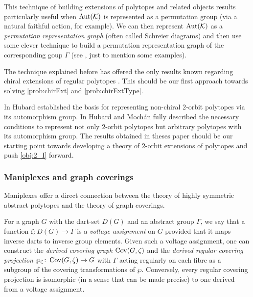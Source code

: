 \documentclass[a4paper,12pt,english]{article}
\begin{document}
This technique of building extensions of polytopes and related objects results particularly useful when $\operatorname{Aut}(\mathcal{K})$ is represented as a permutation group (via a natural faithful action, for example). 
We can then represent $\operatorname{Aut}(\mathcal{K})$ as a \emph{permutation representation graph} (often called Schreier diagrams) and then use some clever technique to build a permutation representation graph of the corresponding goup $\Gamma$ (see \cite{Pellicer2010_ExtensionsDuallyBipartite,PellPotTol2019_ExistenceResultTwo,Pellicer2010_ConstructionHigherRank,PelliWeiss2010_GeneralizedCprGraphs,Pellicer2009_ExtensionsRegularPolytopes,CondHubORe2024_ConstructionChiralPolytopes,ConHubORPe2015_ConstructionChiral4,MonteToled_ChiralExtensionsRegular_preprint,MonteWeiss2021_ProperLocallySpherical}, just to mention some examples).

The technique explained before has offered the only results known regarding chiral extensions of regular polytopes \cite*{CondHubORe2024_ConstructionChiralPolytopes,MonteToled_ChiralExtensionsRegular_preprint}. 
This should be our first approach towards solving \cref{prob:chirExt} and \cref{prob:chirExtType}. 


In \cite{Hubard2010_TwoOrbitPolyhedra} Hubard established the basis for representing non-chiral $2$-orbit polytopes via its automorphism group. 
In \cite*{HubarMocha2023_AllPolytopesAre} Hubard and Mochán fully described the necessary conditions to represent not only $2$-orbit polytopes but arbitrary polytopes with its automorphism group. 
The results obtained in theses paper should be our starting point towards developing a theory of $2$-orbit extensions of polytopes and push \cref{obj:2_I} forward.

\subsubsection*{Maniplexes and graph coverings}

Maniplexes offer a direct connection between the theory of highly symmetric abstract polytopes and the theory of graph coverings. 

For a graph $G$ with the dart-set $D(G)$ and an abstract group $\Gamma$, we say that a function $\zeta :  D(G) \to \Gamma$ is  a \emph{voltage assignment}  on $G$ provided that it maps inverse darts to inverse group elements. 
Given such
 a voltage assignment, one can construct the \emph{derived covering graph} $\operatorname{Cov}(G,\zeta)$ and the \emph{derived regular covering projection}
 $\wp_\zeta \colon \operatorname{Cov}(G,\zeta) \to G$
 with $\Gamma$ acting regularly on each fibre as a subgroup of the covering transformations of $\wp$.
Conversely, every regular covering projection is isomorphic (in a sense that can be made precise) to one derived from a voltage assignment.
\end{document}
